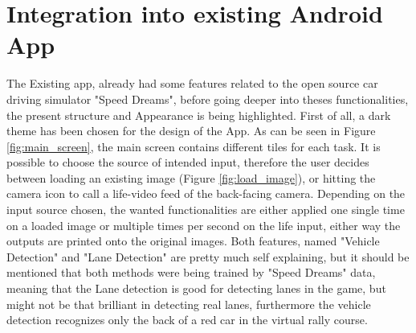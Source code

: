 
\chapter{Integration into existing Android App}\label{chapter:Integration into existing App}

The Existing app, already had some features related to the open source car driving simulator "Speed Dreams", before going deeper into theses functionalities, the present structure and Appearance is being highlighted.
First of all, a dark theme has been chosen for the design of the App. As can be seen in Figure \ref{fig:main_screen}, the main screen contains different tiles for each task. It is possible to choose the source of intended input, therefore the user decides between loading an existing image (Figure \ref{fig:load_image}), or hitting the camera icon to call a life-video feed of the back-facing camera. Depending on the input source chosen, the wanted functionalities are either applied one single time on a loaded image or multiple times per second on the life input, either way the outputs are printed onto the original images. Both features, named "Vehicle Detection" and "Lane Detection" are pretty much self explaining, but it should be mentioned that both methods were being trained by "Speed Dreams" data, meaning that the Lane detection is good for detecting lanes in the game, but might not be that brilliant in detecting real lanes, furthermore the vehicle detection recognizes only the back of a red car in the virtual rally course.
